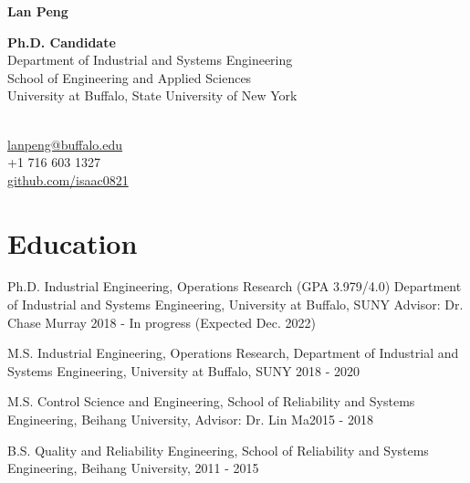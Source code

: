\documentclass[12pt,letterpaper]{report}
\newcommand{\myname}{Lan Peng}
\newcommand{\namefont}[1]{{\normalfont\bfseries\Huge{#1}}}
\begin{document}
    \raggedright{}

    \namefont{\myname}

    \vspace{1em}
    \begin{minipage}[t]{0.700\textwidth}
        \textbf{Ph.D. Candidate} \\
        Department of Industrial and Systems Engineering \\
        School of Engineering and Applied Sciences \\
        University at Buffalo, State University of New York
    \end{minipage}
    \begin{minipage}[t]{0.295\textwidth}
        \flushright{}
        \quad\\
        \href{lanpeng@buffalo.edu}{lanpeng@buffalo.edu} \\
        +1 716 603 1327 \\
        \href{https://github.com/isaac0821}{github.com/isaac0821}
    \end{minipage}


    \section*{Education}
    \begin{tablist}
        \item[Ph.D.]  \tab{}Industrial Engineering, Operations Research (GPA 3.979/4.0) \tab{}Department of Industrial and Systems Engineering, University at Buffalo, SUNY \tab{}Advisor: Dr. Chase Murray \tab{}2018 - In progress (Expected Dec. 2022)
        \item[M.S.]  \tab{}Industrial Engineering, Operations Research, \tab{}Department of Industrial and Systems Engineering, University at Buffalo, SUNY \tab{}2018 - 2020
        \item[M.S.]  \tab{}Control Science and Engineering, \tab{}School of Reliability and Systems Engineering, Beihang University, \tab{}Advisor: Dr. Lin Ma\tab{}2015 - 2018
        \item[B.S.]  \tab{}Quality and Reliability Engineering, \tab{}School of Reliability and Systems Engineering, Beihang University, \tab{}2011 - 2015
    \end{tablist}
\end{document}
